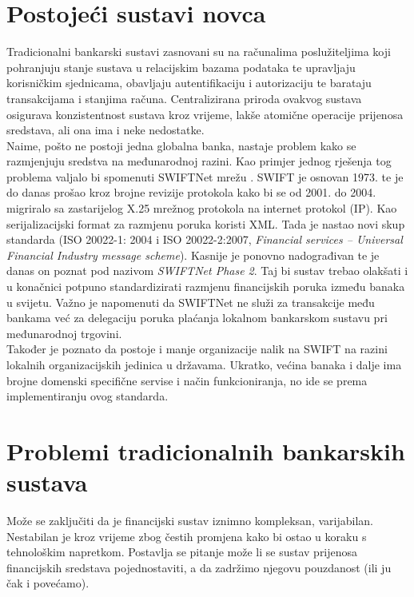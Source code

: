 \documentclass[utf8, zavrsni]{fer}
\begin{document}
\section{Postojeći sustavi novca}
Tradicionalni bankarski sustavi zasnovani su na računalima poslužiteljima koji pohranjuju stanje sustava u relacijskim bazama podataka te upravljaju korisničkim sjednicama, obavljaju autentifikaciju i autorizaciju te barataju transakcijama i stanjima računa. Centralizirana priroda ovakvog sustava osigurava konzistentnost sustava kroz vrijeme, lakše atomične operacije prijenosa sredstava, ali ona ima i neke nedostatke. \\
Naime, pošto ne postoji jedna globalna banka, nastaje problem kako se razmjenjuju sredstva na međunarodnoj razini. Kao primjer jednog rješenja tog problema valjalo bi spomenuti SWIFTNet mrežu \cite{enwiki:1021608159}. SWIFT je osnovan 1973. te je do danas prošao kroz brojne revizije protokola kako bi se od 2001. do 2004. migriralo sa zastarijelog X.25 mrežnog protokola na internet protokol (IP). Kao serijalizacijski format za razmjenu poruka koristi XML. Tada je nastao novi skup standarda (ISO 20022-1: 2004 i ISO 20022-2:2007, \textit{Financial services – Universal Financial Industry message scheme}). Kasnije je ponovno nadograđivan te je danas on poznat pod nazivom \textit{SWIFTNet Phase 2}. Taj bi sustav trebao olakšati i u konačnici potpuno standardizirati razmjenu financijskih poruka između banaka u svijetu. Važno je napomenuti da SWIFTNet ne služi za transakcije među bankama već za delegaciju poruka plaćanja lokalnom bankarskom sustavu pri međunarodnoj trgovini. \\ 

Također je poznato da postoje i manje organizacije nalik na SWIFT na razini lokalnih organizacijskih jedinica u državama. Ukratko, većina banaka i dalje ima brojne domenski specifične servise i način funkcioniranja, no ide se prema implementiranju ovog standarda.

\section{Problemi tradicionalnih bankarskih sustava}
	
Može se zaključiti da je financijski sustav iznimno kompleksan, varijabilan. Nestabilan je kroz vrijeme zbog čestih promjena kako bi ostao u koraku s tehnološkim napretkom. Postavlja se pitanje može li se sustav prijenosa financijskih sredstava pojednostaviti, a da zadržimo njegovu pouzdanost (ili ju čak i povećamo). \\
\end{document}
